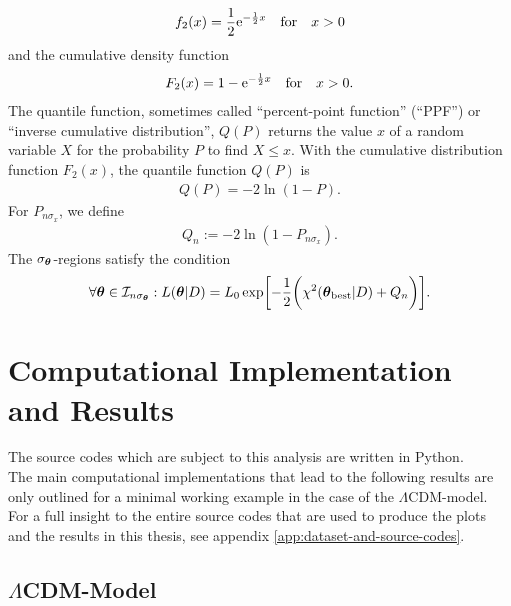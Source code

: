 \begin{align}
    f_{2}(x) = \frac{1}{2} \mathrm{e}^{-\frac{1}{2}x} \quad \text{for} \quad x > 0 \label{eq:probability-density-function-2} 
\end{align}
and the cumulative density function 
\begin{align}
    F_{2}(x) = 1 - \mathrm{e}^{-\frac{1}{2}x} \quad \text{for} \quad x > 0. \label{eq:cumulative-density-function-2} 
\end{align}
The quantile function, sometimes called ``percent-point function'' (``PPF'') or ``inverse cumulative distribution'', $Q(P)$ returns the value $x$ of a random variable $X$ for the probability $P$ to find $X \leq x$. With the cumulative distribution function $F_{2}(x)$, the quantile function $Q(P)$ is 
\begin{align}
    Q(P) = -2 \ln(1 - P). \label{eq:quantile-function} 
\end{align}
For $P_{n \sigma_{x}}$, we define 
\begin{align}
    Q_{n} := -2 \ln(1 - P_{n \sigma_{x}}). \label{eq:quantile-function-n} 
\end{align}
The $\sigma_{\vb*{\theta}}$-regions satisfy the condition
\begin{align}
    \forall \vb*{\theta} \in \mathcal{I}_{n \sigma_{\vb*{\theta}}}: L(\vb*{\theta} \vert D) = L_{0} \exp \biggl[-\frac{1}{2} \biggl(\chi^{2}(\vb*{\theta}_{\text{best}} \vert D) + Q_{n} \biggr)\biggr]. \label{eq:sigma-regions-condition} 
\end{align}


\section{Computational Implementation and Results}

The source codes which are subject to this analysis are written in Python. \\
The main computational implementations that lead to the following results are only outlined for a minimal working example in the case of the $\Lambda$CDM-model. For a full insight to the entire source codes that are used to produce the plots and the results in this thesis, see appendix \ref{app:dataset-and-source-codes}. \\

\subsection{$\Lambda$CDM-Model}

